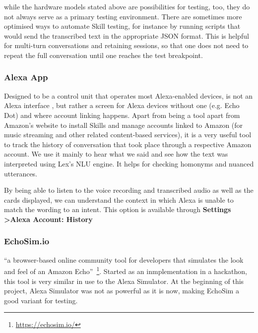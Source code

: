 while the hardware models stated above are possibilities for testing, too, they do not always serve as a primary testing environment. There are sometimes more optimised ways to automate Skill testing, for instance by running scripts that would send the transcribed text in the appropriate JSON format. This is helpful for multi-turn conversations and retaining sessions, so that one does not need to repeat the full conversation until one reaches the test breakpoint.

	
\subsubsection*{Alexa App}
	Designed to be a control unit that operates most Alexa-enabled devices, is not an Alexa interface%
	, but rather a screen for Alexa devices without one (e.g. Echo Dot) and where account linking happens. Apart from being a tool apart from Amazon's website to install Skills and manage accounts linked to Amazon (for music streaming and other related content-based services), it is a very useful tool to track the history of conversation that took place through a respective Amazon account. We use it mainly to hear what we said and see how the text was interpreted using Lex's NLU engine. It helps for checking homonyms and nuanced utterances.
	
	By being able to listen to the voice recording and transcribed audio as well as the cards displayed, we can understand the context in which Alexa is unable to match the wording to an intent. This option is available through \textbf{Settings \textgreater Alexa Account: History} 
	
	\subsubsection*{EchoSim.io}
	 ``a browser-based online community tool for developers that simulates the look and feel of an Amazon Echo''~\footnote{\url{https://echosim.io/}}. Started as an inmplementation in a hackathon, this tool is very similar in use to the Alexa Simulator. At the beginning of this project, Alexa Simulator was not as powerful as it is now, making EchoSim a good variant for testing. %
	
